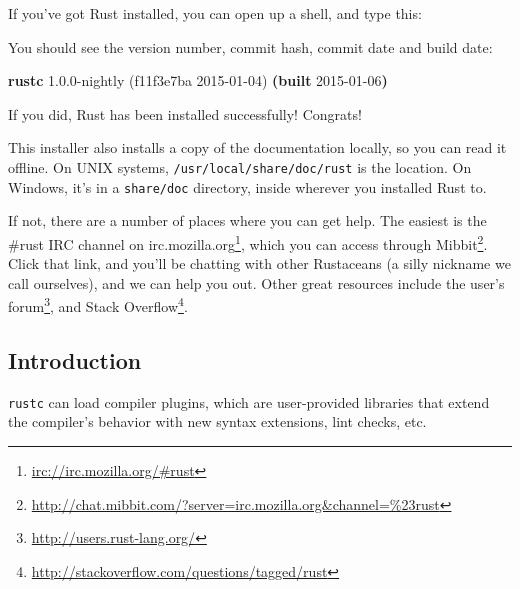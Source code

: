\documentclass[a4paper,]{book}
\newenvironment{Shaded}{\begin{snugshade}}{\end{snugshade}}
\newcommand{\KeywordTok}[1]{\textcolor[rgb]{0.13,0.29,0.53}{\textbf{{#1}}}}
\newcommand{\NormalTok}[1]{{#1}}
\renewcommand{\href}[2]{#2\footnote{\url{#1}}}
\begin{document}
If you've got Rust installed, you can open up a shell, and type this:

\begin{Shaded}
\end{Shaded}

You should see the version number, commit hash, commit date and build
date:

\begin{Shaded}
\begin{Highlighting}[]
\KeywordTok{rustc} \NormalTok{1.0.0-nightly (f11f3e7ba 2015-01-04) }\KeywordTok{(built} \NormalTok{2015-01-06}\KeywordTok{)}
\end{Highlighting}
\end{Shaded}

If you did, Rust has been installed successfully! Congrats!

This installer also installs a copy of the documentation locally, so you
can read it offline. On UNIX systems, \texttt{/usr/local/share/doc/rust}
is the location. On Windows, it's in a \texttt{share/doc} directory,
inside wherever you installed Rust to.

If not, there are a number of places where you can get help. The easiest
is \href{irc://irc.mozilla.org/\#rust}{the \#rust IRC channel on
irc.mozilla.org}, which you can access through
\href{http://chat.mibbit.com/?server=irc.mozilla.org\&channel=\%23rust}{Mibbit}.
Click that link, and you'll be chatting with other Rustaceans (a silly
nickname we call ourselves), and we can help you out. Other great
resources include \href{http://users.rust-lang.org/}{the user's forum},
and \href{http://stackoverflow.com/questions/tagged/rust}{Stack
Overflow}.


\subsection{Introduction}\label{introduction-2}

\texttt{rustc} can load compiler plugins, which are user-provided
libraries that extend the compiler's behavior with new syntax
extensions, lint checks, etc.
\end{document}

